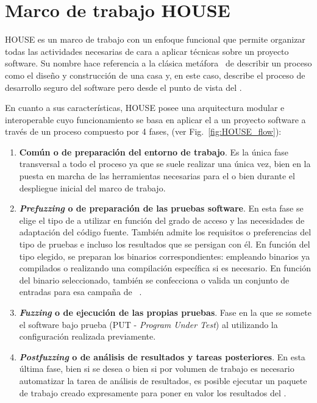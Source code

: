 \documentclass[10pt,conference,a4paper]{IEEEtran}
\begin{document}

\section{Marco de trabajo HOUSE}
\label{Marco_de_trabajo_HOUSE}

HOUSE es un marco de trabajo con un enfoque funcional que permite organizar todas las actividades necesarias de cara a aplicar técnicas {\fz} sobre un proyecto software. Su nombre hace referencia a la clásica metáfora~\cite{SW_ref_metafora} de describir un proceso como el diseño y construcción de una casa y, en este caso, describe el proceso de desarrollo seguro del software pero desde el punto de vista del {\fz}.

En cuanto a sus características, HOUSE posee una arquitectura modular e interoperable cuyo funcionamiento se basa en aplicar el {\fz} a un proyecto software a través de un proceso compuesto por 4 fases, (ver Fig.~\ref{fig:HOUSE_flow}):



\begin{enumerate}
    \item \textbf{Común o de preparación del entorno de trabajo}.
    Es la única fase transversal a todo el proceso ya que se suele realizar una única vez, bien en la puesta en marcha de las herramientas necesarias para el {\fz} o bien durante el despliegue inicial del marco de trabajo.
    \item \textbf{\textit{Prefuzzing} o de preparación de las pruebas software}.
    En esta fase se elige el tipo de {\fz} a utilizar en función del grado de acceso y las necesidades de adaptación del código fuente. También admite los requisitos o preferencias del tipo de pruebas e incluso los resultados que se persigan con él. En función del tipo elegido, se preparan los binarios correspondientes: empleando binarios ya compilados o realizando una compilación específica si es necesario.
    En función del binario seleccionado, también se confecciona o valida un conjunto de entradas para esa campaña de {\fz}~\cite{fuzzing_SOA}.
    \item \textbf{\textit{Fuzzing} o de ejecución de las propias pruebas}.
    Fase en la que se somete el software bajo prueba (PUT - \textit{Program Under Test}) al {\fz} utilizando la configuración realizada previamente.
    \item \textbf{\textit{Postfuzzing} o de análisis de resultados y tareas posteriores}.
    En esta última fase, bien si se desea o bien si por volumen de trabajo es necesario automatizar la tarea de análisis de resultados, es posible ejecutar un paquete de trabajo creado expresamente para poner en valor los resultados del {\fz}.
\end{enumerate}
\end{document}
